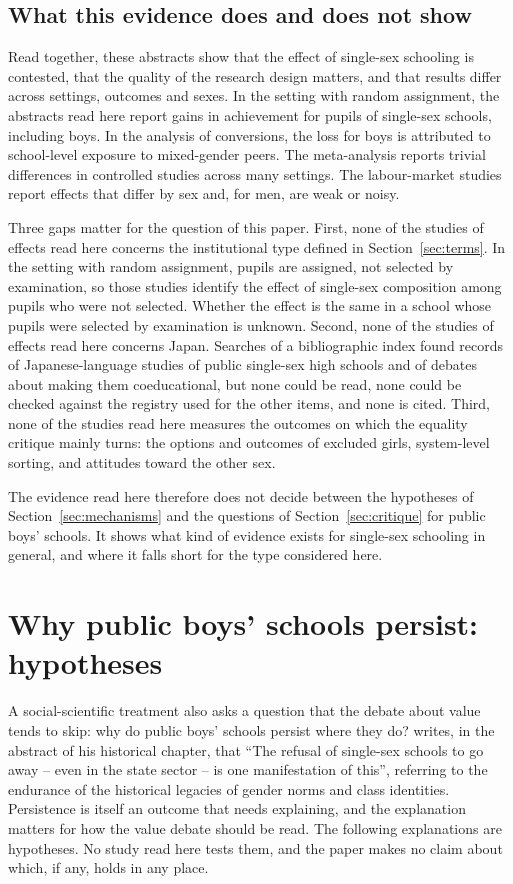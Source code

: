 \documentclass[11pt]{article}
\newcommand{\srcq}[2]{``#2''}
\newcounter{mech}
\begin{document}
\subsection{What this evidence does and does not show}

Read together, these abstracts show that the effect of single-sex schooling is contested, that the quality of the research design matters, and that results differ across settings, outcomes and sexes. In the setting with random assignment, the abstracts read here report gains in achievement for pupils of single-sex schools, including boys. In the analysis of conversions, the loss for boys is attributed to school-level exposure to mixed-gender peers. The meta-analysis reports trivial differences in controlled studies across many settings. The labour-market studies report effects that differ by sex and, for men, are weak or noisy.

Three gaps matter for the question of this paper. First, none of the studies of effects read here concerns the institutional type defined in Section~\ref{sec:terms}. In the setting with random assignment, pupils are assigned, not selected by examination, so those studies identify the effect of single-sex composition among pupils who were not selected. Whether the effect is the same in a school whose pupils were selected by examination is unknown. Second, none of the studies of effects read here concerns Japan. Searches of a bibliographic index found records of Japanese-language studies of public single-sex high schools and of debates about making them coeducational, but none could be read, none could be checked against the registry used for the other items, and none is cited. Third, none of the studies read here measures the outcomes on which the equality critique mainly turns: the options and outcomes of excluded girls, system-level sorting, and attitudes toward the other sex.

The evidence read here therefore does not decide between the hypotheses of Section~\ref{sec:mechanisms} and the questions of Section~\ref{sec:critique} for public boys' schools. It shows what kind of evidence exists for single-sex schooling in general, and where it falls short for the type considered here.

\section{Why public boys' schools persist: hypotheses}\label{sec:persistence}

A social-scientific treatment also asks a question that the debate about value tends to skip: why do public boys' schools persist where they do? \citet{aspinall2024history} writes, in the abstract of his historical chapter, that \srcq{aspinall2024history}{The refusal of single-sex schools to go away -- even in the state sector -- is one manifestation of this}, referring to the endurance of the historical legacies of gender norms and class identities. Persistence is itself an outcome that needs explaining, and the explanation matters for how the value debate should be read. The following explanations are hypotheses. No study read here tests them, and the paper makes no claim about which, if any, holds in any place.
\end{document}
